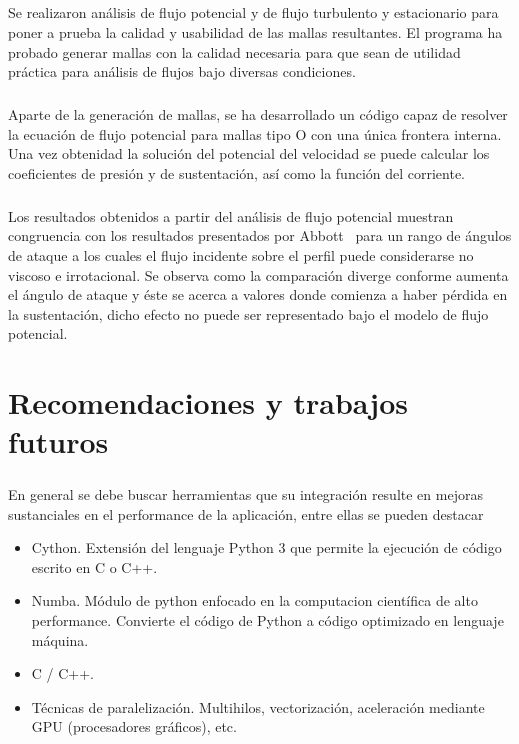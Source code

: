 \documentclass[letterpaper, openright, 12pt]{book}
\begin{document}
\paragraph*{}
    Se realizaron análisis de flujo potencial y de flujo turbulento y
    estacionario para poner a prueba la calidad y usabilidad de las mallas
    resultantes. El programa ha probado generar mallas con la calidad necesaria
    para que sean de utilidad práctica para análisis de flujos bajo diversas
    condiciones.

\paragraph*{}
    Aparte de la generación de mallas, se ha desarrollado un código capaz de
    resolver la ecuación de flujo potencial para mallas tipo O con una única
    frontera interna. Una vez obtenidad la solución del potencial del velocidad
    se puede calcular los coeficientes de presión y de sustentación, así como
    la función del corriente.

\paragraph*{}
    Los resultados obtenidos a partir del análisis de flujo potencial muestran
    congruencia con los resultados presentados por Abbott~\cite{abbott} para un
    rango de ángulos de ataque a los cuales el flujo incidente sobre el perfil
    puede considerarse no viscoso e irrotacional. Se observa como la
    comparación diverge conforme aumenta el ángulo de ataque y éste se acerca a
    valores donde comienza a haber pérdida en la sustentación, dicho efecto no
    puede ser representado bajo el modelo de flujo potencial.

%
%
%
%
%

%
%
%
%
%
\chapter{Recomendaciones y trabajos futuros}
\paragraph*{}
    En general se debe buscar herramientas que su integración resulte en
    mejoras sustanciales en el performance de la aplicación, entre ellas se
    pueden destacar
    \begin{itemize}
            \item Cython. Extensión del lenguaje Python 3 que permite la
                ejecución de código escrito en C o C++.
            \item Numba. Módulo de python enfocado en la computacion
                científica de alto performance. Convierte el código de Python
                a código optimizado en lenguaje máquina.  \item C / C++.
            \item Técnicas de paralelización. Multihilos, vectorización,
                aceleración mediante GPU (procesadores gráficos), etc.
    \end{itemize}
\end{document}
